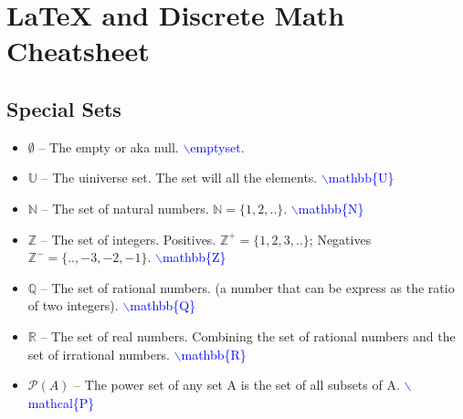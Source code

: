 \documentclass[12pt]{article}
\begin{document}
\section*{LaTeX and Discrete Math Cheatsheet}

\subsection*{Special Sets}

\begin{itemize}
    \item $\emptyset$ -- The empty or aka null. \textcolor{blue} {$\backslash$emptyset}.
    \item $\mathbb{U}$ -- The uiniverse set. The set will all the elements. \textcolor{blue} {$\backslash$mathbb\{U\}}
    \item $\mathbb{N}$ -- The set of natural numbers. $\mathbb{N}=\{1,2,..\}$. \textcolor{blue} {$\backslash$mathbb\{N\}}
    \item $\mathbb{Z}$ -- The set of integers. Positives. $\mathbb{Z}^+=\{1, 2, 3,..\}$; Negatives $\mathbb{Z}^-=\{..,-3, -2, -1\}$. \textcolor{blue} {$\backslash$mathbb\{Z\}}
    \item $\mathbb{Q}$ -- The set of rational numbers. (a number that can be express as the ratio of two integers). \textcolor{blue} {$\backslash$mathbb\{Q\}}
    \item $\mathbb{R}$ -- The set of real numbers. Combining the set of rational numbers and the set of irrational numbers. \textcolor{blue} {$\backslash$mathbb\{R\}}
    \item $\mathcal{P} (A)$ -- The power set of any set A is the set of all subsets of A. \textcolor{blue} {$\backslash$mathcal\{P\}}
\end{itemize}
\end{document}

